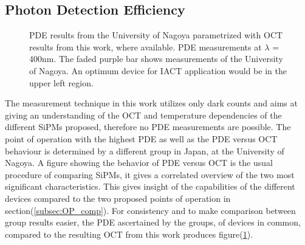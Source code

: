 \documentclass[12pt,article,type=msc,colorback,accentcolor=tud9c]{tudthesis}
\begin{document}
\subsection{Photon Detection Efficiency}
\begin{figure}[h!]
\begin{centering}
\caption[PDE versus OCT comparison]{PDE results from the University of Nagoya parametrized with OCT results from this work, where available. PDE measurements at $\lambda$ = 400nm. The faded purple bar shows measurements of the University of Nagoya. An optimum device for IACT application would be in the upper left region.}
\label{fig:Nagoya_PDE_me_OCT}
\end{centering}
\end{figure}
The measurement technique in this work utilizes only dark counts and aims at giving an understanding of the OCT and temperature dependencies of the different SiPMs proposed, therefore no PDE measurements are possible. The point of operation with the highest PDE as well as the PDE versus OCT behaviour is determined by a different group in Japan, at the University of Nagoya. A figure showing the behavior of PDE versus OCT is the usual procedure of comparing SiPMs, it gives a correlated overview of the two most significant characteristics. This gives insight of the capabilities of the different devices compared to the two proposed points of operation in section(\ref{subsec:OP_comp}). For consistency and to make comparison between group results easier, the PDE ascertained by the groups, of devices in common, compared to the resulting OCT from this work produces figure(\ref{fig:Nagoya_PDE_me_OCT}).\\
\end{document}
